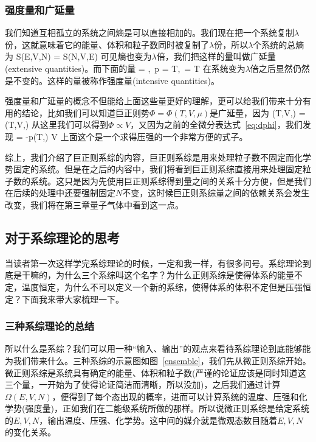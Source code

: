 \documentclass[11pt]{ctexart}
\begin{document}
\subsubsection{强度量和广延量}
我们知道互相孤立的系统之间熵是可以直接相加的。我们现在把一个系统复制$\lambda$份，这就意味着它的能量、体积和粒子数同时被复制了$\lambda$份，所以$\lambda$个系统的总熵为
\beq
S(\lambda E,\lambda V,\lambda N) = \lambda S(N,V,E)
\eeq
可见熵也变为$\lambda$倍，我们把这样的量叫做广延量(extensive quantities)。而下面的量
\beq
{} = ,\, p = T,\, \mu = T
\eeq
在系统变为$\lambda$倍之后显然仍然是不变的。这样的量被称作强度量(intensive quantities)。

强度量和广延量的概念不但能给上面这些量更好的理解，更可以给我们带来十分有用的结论，比如我们可以知道巨正则势$\Phi=\Phi(T,V,\mu)$是广延量，因为
\beq
\Phi(T,\lambda V,\mu) = \lambda \Phi(T,V,\mu)
\eeq
从这里我们可以得到$\Phi \propto V$，又因为之前的全微分表达式~\ref{eq:dphi}，我们发现
\beq
\Phi = -p(T,\mu) V
\eeq
上面这个是一个求得压强的一个非常方便的式子。

综上，我们介绍了巨正则系综的内容，巨正则系综是用来处理粒子数不固定而化学势固定的系统。但是在之后的内容中，我们将看到巨正则系综直接用来处理固定粒子数的系统。这只是因为先使用巨正则系综得到量之间的关系十分方便，但是我们在后续的处理中还要强制固定$N$不变，这时候巨正则系综量之间的依赖关系会发生改变，我们将在第三章量子气体中看到这一点。
\newpage
\subsection{对于系综理论的思考}
当读者第一次这样学完系综理论的时候，一定和我一样，有很多问号。系综理论到底是干嘛的，为什么三个系综叫这个名字？为什么正则系综是使得体系的能量不定，温度恒定，为什么不可以定义一个新的系综，使得体系的体积不定但是压强恒定？下面我来带大家梳理一下。
\subsubsection{三种系综理论的总结}
所以什么是系综？我们可以用一种“输入、输出”的观点来看待系综理论到底能够能为我们带来什么。三种系综的示意图如图~\ref{ensemble}，我们先从微正则系综开始。微正则系综是系统具有确定的能量、体积和粒子数(严谨的论证应该是同时知道这三个量，一开始为了使得论证简洁而清晰，所以没加)，之后我们通过计算$\Omega(E,V,N)$，便得到了每个态出现的概率，进而可以计算系统的温度、压强和化学势(强度量)，正如我们在二能级系统所做的那样。所以说微正则系综是给定系统的$E,V,N$，输出温度、压强、化学势。这中间的媒介就是微观态数目随着$E,V,N$的变化关系。
\end{document}
